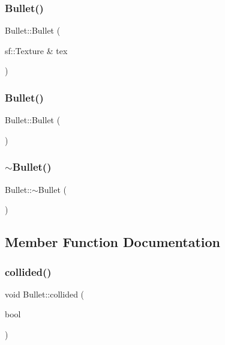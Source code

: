 \subsubsection{\texorpdfstring{Bullet()}{Bullet()}\hspace{0.1cm}{\footnotesize\ttfamily [1/2]}}
{\footnotesize\ttfamily Bullet\+::\+Bullet (\begin{DoxyParamCaption}\item[{sf\+::\+Texture \&}]{tex }\end{DoxyParamCaption})}

\mbox{\label{class_bullet_acd7befc0bc18907cc1d871d37bbdddeb}} 
\subsubsection{\texorpdfstring{Bullet()}{Bullet()}\hspace{0.1cm}{\footnotesize\ttfamily [2/2]}}
{\footnotesize\ttfamily Bullet\+::\+Bullet (\begin{DoxyParamCaption}{ }\end{DoxyParamCaption})}

\mbox{\label{class_bullet_aaeb5cb41d7db89f49007b08b41f1bfcf}} 
\subsubsection{\texorpdfstring{$\sim$\+Bullet()}{~Bullet()}}
{\footnotesize\ttfamily Bullet\+::$\sim$\+Bullet (\begin{DoxyParamCaption}{ }\end{DoxyParamCaption})}



\subsection{Member Function Documentation}
\mbox{\label{class_bullet_a49da1f5862bcb89f36588ead6e620c06}} 
\subsubsection{\texorpdfstring{collided()}{collided()}}
{\footnotesize\ttfamily void Bullet\+::collided (\begin{DoxyParamCaption}\item[{bool}]{ }\end{DoxyParamCaption})}

